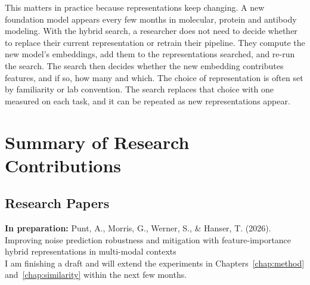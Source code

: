 This matters in practice because representations keep changing. A new foundation model appears every few months in molecular, protein and antibody modeling. With the hybrid search, a researcher does not need to decide whether to replace their current representation or retrain their pipeline. They compute the new model's embeddings, add them to the representations searched, and re-run the search. The search then decides whether the new embedding contributes features, and if so, how many and which. The choice of representation is often set by familiarity or lab convention. The search replaces that choice with one measured on each task, and it can be repeated as new representations appear.


\pagebreak
\chapter*{Summary of Research Contributions}


\section*{Research Papers}

\textbf{In preparation:} Punt, A., Morris, G., Werner, S., \& Hanser, T. (2026). Improving noise prediction robustness and mitigation with feature-importance hybrid representations in multi-modal contexts \\ I am finishing a draft and will extend the experiments in Chapters~\ref{chap:method} and~\ref{chap:similarity} within the next few months.

